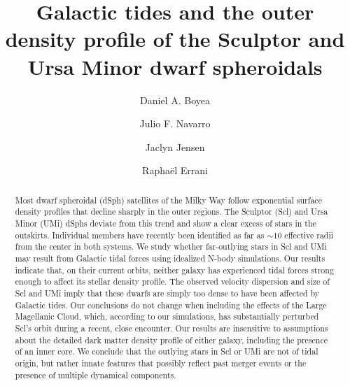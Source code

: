 \documentclass[linenumbers, twocolumn, twocolappendix]{aastex701}
\providecommand{\DIFaddbegin}{} %
\providecommand{\DIFaddend}{} %
\begin{document}
\title{Galactic tides and the outer density profile of the Sculptor and Ursa Minor dwarf spheroidals}



\author[orcid=0009-0008-8903-160X, gname='Daniel', sname='Boyea']{Daniel A. Boyea}


\author[0000-0003-3862-5076, gname='Julio', sname='Navarro']{Julio F. Navarro}
\DIFaddbegin {}
\DIFaddend {}

\author[0000-0002-4350-7632, gname='Jaclyn', sname='Jensen']{Jaclyn Jensen}

\author[]{Rapha\"el Errani}




\begin{abstract}
   Most dwarf spheroidal (dSph) satellites  of the Milky Way follow exponential surface density profiles that decline sharply in the outer regions. The Sculptor (Scl) and Ursa Minor (UMi) dSphs deviate from this trend and show a clear excess of stars in the outskirts. Individual members have recently been identified as far as ${\sim}10$ effective radii from the center in both systems.
   We study whether far-outlying stars in Scl and UMi may result from Galactic tidal forces using idealized N-body simulations.
   Our results indicate that, on their current orbits, neither galaxy has experienced tidal forces strong enough to affect its stellar density profile. The observed velocity dispersion and size of Scl and UMi imply that these dwarfs are simply too dense to have been affected by Galactic tides. Our conclusions do not change when including the effects of the Large Magellanic Cloud, which, according to our simulations, has substantially perturbed Scl's orbit during a recent, close encounter. Our results are insensitive to assumptions about the detailed dark matter density profile of either galaxy, including the presence of an inner core. 
  We conclude that the outlying stars in Scl or UMi are not of tidal origin, but rather innate features that possibly reflect past merger events or the presence of multiple dynamical components.
\end{abstract}
\end{document}
